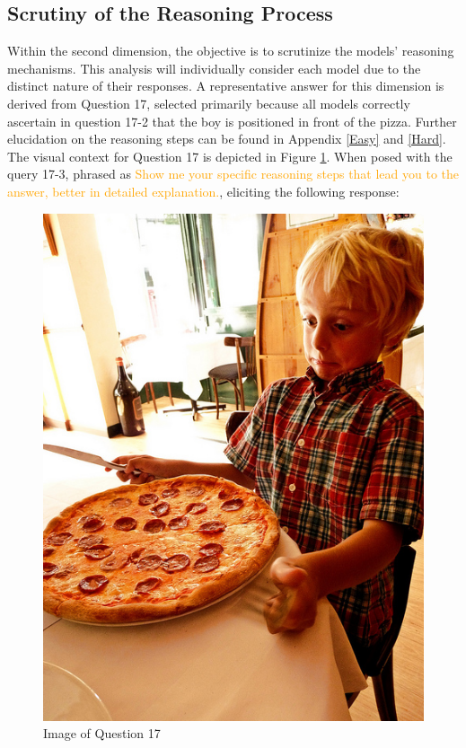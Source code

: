 \documentclass[twocolumn,11pt]{report}
\begin{document}
\subsection{Scrutiny of the Reasoning Process}

Within the second dimension, the objective is to scrutinize the models' reasoning mechanisms. This analysis will individually consider each model due to the distinct nature of their responses. A representative answer for this dimension is derived from Question 17, selected primarily because all models correctly ascertain in question 17-2 that the boy is positioned in front of the pizza. Further elucidation on the reasoning steps can be found in Appendix \ref{Easy} and \ref{Hard}. The visual context for Question 17 is depicted in Figure \ref{fig:reasoning-process}. When posed with the query 17-3, phrased as \textcolor{orange}{Show me your specific reasoning steps that lead you to the answer, better in detailed explanation.}, eliciting the following response:

\begin{figure}[h]
    \centering
    \includegraphics[width=0.6\linewidth]{../image set/easy/000000089367.jpg}
    \caption{Image of Question 17}
    \label{fig:reasoning-process}
\end{figure}
\end{document}
